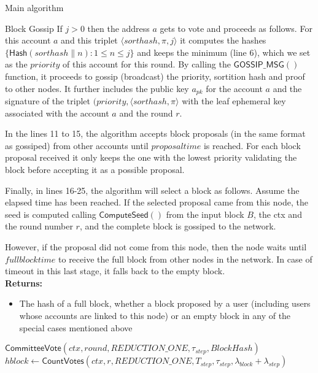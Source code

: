 \documentclass[10pt,a4paper]{article}
\begin{document}
\begin{section}{Main algorithm}
\begin{subsection}{Block Gossip}
If $j>0$ then the address $a$ gets to vote and proceeds as follows.
For this account $a$ and this triplet $\langle sorthash, \pi, j\rangle$
it computes the hashes $\{ \mathsf{Hash}(sorthash \| n):1\le n\le j\}$
and keeps the minimum (line 6), which we set as the $priority$ of this
account for this round. 
By calling the $\mathsf{GOSSIP\_MSG}()$ function, it proceeds to gossip
(broadcast) the priority, sortition hash and proof to other nodes.
It further includes the public key $a_{pk}$ for the account $a$ and the
signature of the triplet $(priority, \langle sorthash, \pi\rangle$ with the 
leaf ephemeral key associated with the account $a$ and the round $r$.

In the lines 11 to 15, the algorithm accepts block proposals (in the same 
format as gossiped) from other accounts until $proposal time$ is reached.
For each block proposal received it only keeps the one with the lowest 
priority validating the block before accepting it as a possible proposal.

Finally, in lines 16-25, the algorithm will select a block as 
follows. Assume the elapsed time has been reached. 
If the selected proposal came from this node, the seed is computed 
calling $\mathsf{ComputeSeed}()$ from the input block $B$, the ctx and
the round number $r$, and the complete block is gossiped to the network.

However, if the proposal did not come from this node, then the node 
waits until $fullblocktime$ to receive the full block from other nodes
in the network.
In case of timeout in this last stage, it falls back to the empty block.\\

\noindent \textbf{Returns:}
\begin{itemize}
    \item The hash of a full block, whether a block proposed by a user (including users whose accounts are 
    linked to this node) or an empty block in any of the special cases mentioned above
  \end{itemize}

\begin{algorithm}[H]
    \begin{algorithmic}[H]
    
    \State $\mathsf{CommitteeVote}(ctx, round, REDUCTION\_ONE, \tau_{step}, BlockHash)$
    \State $hblock \gets \mathsf{CountVotes}(ctx, r, REDUCTION\_ONE, T_{step}, \tau_{step}, \lambda_{block} + \lambda_{step})$


\end{algorithmic}
\end{algorithm}
\end{subsection}
\end{section}
\end{document}
